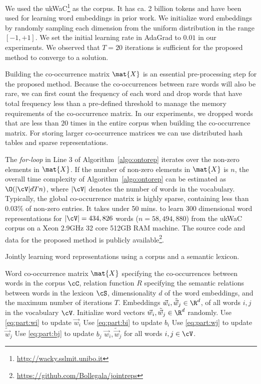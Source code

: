 \documentclass[letterpaper]{article}
\begin{document}
We used the ukWaC\footnote{\url{http://wacky.sslmit.unibo.it}} as the corpus.
It has ca. 2 billion tokens and have been used for learning word embeddings in prior work.
We initialize word embeddings by randomly sampling each dimension from the uniform distribution in the range $[-1,+1]$.
We set the initial learning rate in AdaGrad to $0.01$ in our experiments.
We observed that $T = 20$ iterations is sufficient for the proposed method to converge to a solution.

Building the co-occurrence matrix $\mat{X}$ is an essential pre-processing step for the proposed method.
Because the co-occurrences between rare words will also be rare, we can first count the frequency of each word and
drop words that have total frequency less than a pre-defined threshold to manage the memory requirements of the
co-occurrence matrix. In our experiments, we dropped words that are less than $20$ times in the entire corpus
when building the co-occurrence matrix.
For storing larger co-occurrence matrices we can use distributed hash tables and sparse representations.

The \emph{for-loop} in Line 3 of Algorithm~\ref{algo:ontorep} iterates over the non-zero
elements in $\mat{X}$. If the number of non-zero elements in $\mat{X}$ is $n$, the overall time complexity
of Algorithm~\ref{algo:ontorep} can be estimated as $\O(|\cV|dTn)$, where $|\cV|$ denotes the number of words
in the vocabulary.
Typically, the global co-occurrence matrix is highly sparse, containing less than $0.03\%$ of non-zero entries.
It takes under 50 mins. to learn $300$ dimensional word representations for $|\cV| = 434,826$ words
($n = 58,494,880$) from the ukWaC corpus
on a Xeon 2.9GHz 32 core 512GB RAM machine.
The source code and data for the proposed method is publicly available\footnote{\url{https://github.com/Bollegala/jointreps}}.

\begin{algorithm}[t]
\small
\caption{Jointly learning word representations using a corpus and a semantic lexicon.}
\label{algo:ontorep}
\begin{algorithmic}[1]
\REQUIRE Word co-occurrence matrix $\mat{X}$ specifying the co-occurrences between words in the corpus $\cC$,
		relation function $R$ specifying the semantic relations between words in the lexicon $\cS$,
		dimensionality $d$ of the word embeddings, and the maximum number of iterations $T$.
\ENSURE Embeddings $\vec{w}_i, \tilde{\vec{w}}_j \in \R^d$, of all words $i, j$ in the vocabulary $\cV$.
\medskip
\STATE Initialize word vectors $\vec{w}_i, \tilde{\vec{w}}_j \in \R^d$ randomly. \label{line:init}
		\STATE Use \eqref{eq:part:wi} to update $\vec{w}_i$
		\STATE Use \eqref{eq:part:bi} to update $b_i$
		\STATE Use \eqref{eq:part:wj} to update $\tilde{\vec{w}}_j$
		\STATE Use \eqref{eq:part:bj} to update $b_j$
	\ENDFOR
\ENDFOR
\RETURN $\vec{w}_i, \tilde{\vec{w}}_j$ for all words $i,j \in \cV$.
\end{algorithmic}
\end{algorithm}
\end{document}
